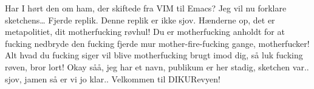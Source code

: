 \documentclass[a4paper,11pt]{article}
\begin{document}
\begin{sketch}
 Har I hørt den om ham, der skiftede fra VIM til Emacs?
 Jeg vil nu forklare sketchens… Fjerde replik. Denne replik er ikke sjov.
 Hænderne op, det er metapolitiet, dit motherfucking røvhul! Du er motherfucking anholdt for at fucking nedbryde den fucking fjerde mur mother-fire-fucking gange, motherfucker! Alt hvad du fucking siger vil blive motherfucking brugt imod dig, så luk fucking røven, bror lort!
 Okay såå, jeg har et navn, publikum er her stadig, sketchen var.. sjov, jamen så er vi jo klar.. Velkommen til DIKURevyen!
\end{sketch}
\end{document}
